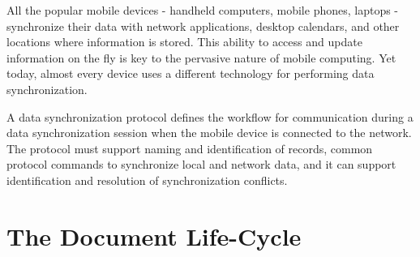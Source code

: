 \documentclass[%
	final,
	notitlepage,
	narroweqnarray,
	inline,
	twoside,
	]{ieee}
\newcommand{\latexiie}{\LaTeX2{\Large$_\varepsilon$}}
\begin{document}
\PARstart All the popular mobile devices - handheld computers, mobile phones, 
laptops  - synchronize their data with network applications, desktop  calendars, 
and other locations where information is stored. This ability to access and update 
information on the fly is key to the pervasive nature of mobile computing. Yet 
today, almost every device uses a different technology for performing data 
synchronization.

A data synchronization protocol defines the workflow for communication during a
data synchronization session when the mobile device is connected to the network.
The protocol must support naming and identification of records, common protocol
commands to synchronize local and network data, and it can support identification
and resolution of synchronization conflicts.



\section{The Document Life-Cycle}
\end{document}

